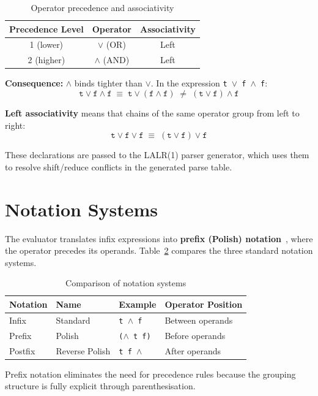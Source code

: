 \begin{table}[H]
\centering
\caption{Operator precedence and associativity}
\label{table:precedence}
\begin{tabular}{@{}ccc@{}}
\toprule
Precedence Level & Operator & Associativity \\
\midrule
1 (lower)  & $\vee$ (OR)  & Left \\
2 (higher) & $\wedge$ (AND) & Left \\
\bottomrule
\end{tabular}
\end{table}

\textbf{Consequence:} $\wedge$ binds tighter than $\vee$. In the expression \texttt{t $\vee$ f $\wedge$ f}:
\begin{equation}
\texttt{t} \vee \texttt{f} \wedge \texttt{f} \;\equiv\; \texttt{t} \vee (\texttt{f} \wedge \texttt{f}) \;\neq\; (\texttt{t} \vee \texttt{f}) \wedge \texttt{f}
\end{equation}

\textbf{Left associativity} means that chains of the same operator group from left to right:
\begin{equation}
\texttt{t} \vee \texttt{f} \vee \texttt{f} \;\equiv\; (\texttt{t} \vee \texttt{f}) \vee \texttt{f}
\end{equation}

These declarations are passed to the LALR(1) parser generator, which uses them to resolve shift/reduce conflicts in the generated parse table.

\section{Notation Systems}

The evaluator translates infix expressions into \textbf{prefix (Polish) notation}~\citep{lukasiewicz1957}, where the operator precedes its operands. Table~\ref{table:notations} compares the three standard notation systems.

\begin{table}[H]
\centering
\caption{Comparison of notation systems}
\label{table:notations}
\begin{tabular}{@{}llll@{}}
\toprule
Notation & Name & Example & Operator Position \\
\midrule
Infix   & Standard        & \texttt{t $\wedge$ f} & Between operands \\
Prefix  & Polish          & \texttt{($\wedge$ t f)} & Before operands \\
Postfix & Reverse Polish  & \texttt{t f $\wedge$}   & After operands \\
\bottomrule
\end{tabular}
\end{table}

Prefix notation eliminates the need for precedence rules because the grouping structure is fully explicit through parenthesisation.
